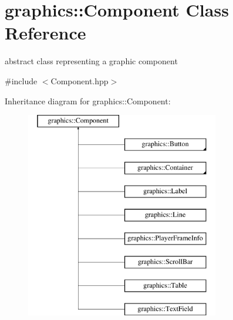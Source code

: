 \hypertarget{classgraphics_1_1_component}{\section{graphics\-:\-:Component Class Reference}
\label{classgraphics_1_1_component}
}


abstract class representing a graphic component  




{\ttfamily \#include $<$Component.\-hpp$>$}

Inheritance diagram for graphics\-:\-:Component\-:\begin{figure}[H]
\begin{center}
\leavevmode
\includegraphics[height=9.000000cm]{classgraphics_1_1_component}
\end{center}
\end{figure}
